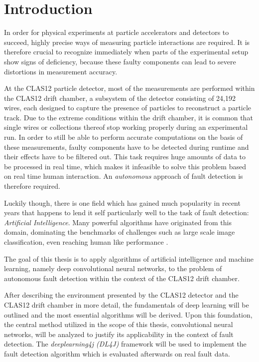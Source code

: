 \chapter{Introduction}

In order for physical experiments at particle accelerators and
detectors to succeed, highly precise ways
of measuring particle interactions are required. It is therefore
crucial to recognize immediately when parts of the experimental setup
show signs of deficiency, because these faulty components can lead to
severe distortions in measurement accuracy.

At the CLAS12 particle detector, most of the measurements are
performed within the CLAS12 drift chamber, a subsystem of the detector
consisting of 24,192 wires, each designed to capture the presence of
particles to reconstruct a particle track. Due to the extreme
conditions within the drift chamber, it
is common that single wires or collections thereof stop working
properly during an experimental run. In order to still be able to
perform accurate computations on the basis of these measurements,
faulty components have to be detected during runtime and their effects
have to be filtered out. This task requires huge amounts of data to be
processed in real time, which makes it infeasible to solve this
problem based on real time human interaction. An \textit{autonomous}
approach of fault detection is therefore required.

Luckily though, there is one field which has gained much popularity
in recent years that happens to lend it self particularly well to
the task of fault detection: \textit{Artificial
  Intelligence}. Many powerful algorithms have originated from this
domain, dominating the benchmarks of challenges such
as large scale image classification, even reaching human like
performance \cite{Russakovsky}.

The goal of this thesis is to apply algorithms of artificial
intelligence and machine learning, namely deep convolutional neural
networks, to the problem of autonomous fault detection within the
context of the CLAS12 drift chamber.

After describing the environment presented by the CLAS12 detector and
the CLAS12 drift chamber in more detail, the fundamentals of deep
learning will be outlined and the most essential algorithms will be
derived. Upon this foundation, the central method utilized in the
scope of this thesis, convolutional neural networks, will be analyzed
to justify its applicability in the context of fault detection. The
\textit{deeplearning4j (DL4J)} framework will be used to implement the
fault detection algorithm which is evaluated afterwards on real fault
data.
